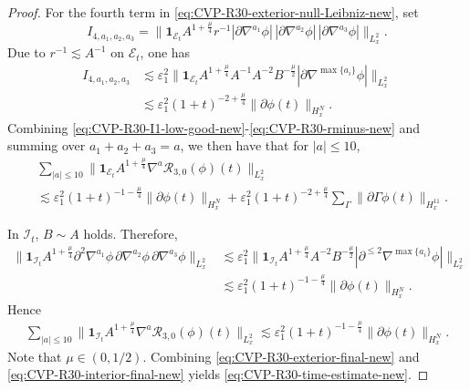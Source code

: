 \documentclass[11pt,twoside]{article}
\def\p{\partial}
\def\ve{\varepsilon}
\def\ls{\lesssim}
\theoremstyle{plain}
\theoremstyle{definition}
\theoremstyle{assumption}
\numberwithin{equation}{section}
\begin{document}
\begin{proof}
		For the fourth term in \eqref{eq:CVP-R30-exterior-null-Leibniz-new},  set
		\[
		I_{4,a_1,a_2,a_3}
		=
		\big\|
		\mathbf 1_{\mathcal E_t}
		A^{1+\frac{\mu}{4}}
		r^{-1}
		|\p\nabla^{a_1}\phi|\,
		|\p\nabla^{a_2}\phi|\,
		|\p\nabla^{a_3}\phi|
		\big\|_{L^2_x}.
		\]
		Due to \(r^{-1}\ls A^{-1}\) on
		\(\mathcal E_t\), one has
		\begin{equation}
			\label{eq:CVP-R30-rminus-new}
			\begin{aligned}
				I_{4,a_1,a_2,a_3}
				&\ls
				\ve_1^2
				\big\|
				\mathbf 1_{\mathcal E_t}
				A^{1+\frac{\mu}{4}}
				A^{-1}
				A^{-2}B^{-\frac{\mu}{2}}
				|\p\nabla^{\max \{a_i\}}\phi|
				\big\|_{L^2_x}
				\\
				&\ls
				\ve_1^2
				(1+t)^{-2+\frac{\mu}{4}}
				\|\p\phi(t)\|_{H^N_x}.
			\end{aligned}
		\end{equation}
		Combining \eqref{eq:CVP-R30-I1-low-good-new}-\eqref{eq:CVP-R30-rminus-new} and summing over
		\(a_1+a_2+a_3=a\), we then have that for \(|a|\le 10\),
		\begin{equation}
			\label{eq:CVP-R30-exterior-final-new}
			\begin{aligned}
				&
				\sum_{|a|\le 10}
				\big\|
				\mathbf 1_{\mathcal E_t}
				A^{1+\frac{\mu}{4}}
				\nabla^a\mathcal R_{3,0}(\phi)(t)
				\big\|_{L^2_x}\\
				&
				\ls
				\ve_1^2
				(1+t)^{-1-\frac{\mu}{4}}
				\|\p\phi(t)\|_{H^N_x}
				+
				\ve_1^2
				(1+t)^{-2+\frac{\mu}{4}}
				\sum_{\Gamma}
				\|\p\Gamma\phi(t)\|_{H^{11}_x}.
			\end{aligned}
		\end{equation}
		
		In $\mathcal I_t$,  \(B\sim A\) holds. Therefore,
		\begin{equation}
			\label{eq:CVP-R30-interior-new}
			\begin{aligned}
				\big\|
				\mathbf 1_{\mathcal I_t}
				A^{1+\frac{\mu}{4}}
				\p^2\nabla^{a_1}\phi\,
				\p\nabla^{a_2}\phi\,
				\p\nabla^{a_3}\phi
				\big\|_{L^2_x}
				&\ls
				\ve_1^2
				\big\|
				\mathbf 1_{\mathcal I_t}
				A^{1+\frac{\mu}{4}}
				A^{-2}B^{-\frac{\mu}{2}}
				|\p^{\le2}\nabla^{\max \{a_i\}}\phi|
				\big\|_{L^2_x}\\
				&
				\ls
				\ve_1^2
				(1+t)^{-1-\frac{\mu}{4}}
				\|\p\phi(t)\|_{H^N_x}.
			\end{aligned}
		\end{equation}
		Hence
		\begin{equation}
			\label{eq:CVP-R30-interior-final-new}
			\begin{aligned}
				\sum_{|a|\le 10}
				\big\|
				\mathbf 1_{\mathcal I_t}
				A^{1+\frac{\mu}{4}}
				\nabla^a\mathcal R_{3,0}(\phi)(t)
				\big\|_{L^2_x}
				\ls
				\ve_1^2
				(1+t)^{-1-\frac{\mu}{4}}
				\|\p\phi(t)\|_{H^N_x}.
			\end{aligned}
		\end{equation}
		Note that $\mu \in (0,1/2)$. Combining \eqref{eq:CVP-R30-exterior-final-new} and \eqref{eq:CVP-R30-interior-final-new} yields \eqref{eq:CVP-R30-time-estimate-new}.
		

\end{proof}
\end{document}
